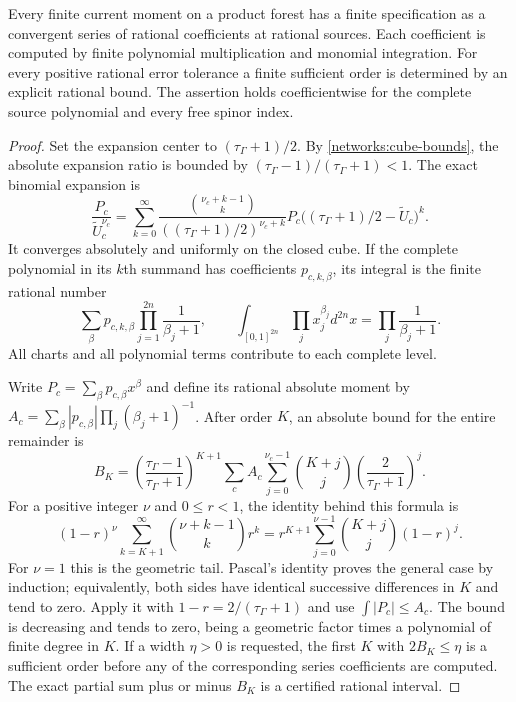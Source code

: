 \begin{theorem}
\label{networks:rational-series}
Every finite current moment on a product forest has a finite specification
as a convergent series of rational coefficients at rational sources.
Each coefficient is computed by finite polynomial multiplication and
monomial integration.  For every positive rational error tolerance a
finite sufficient order is determined by an explicit rational bound.
The assertion holds coefficientwise for the complete source polynomial
and every free spinor index.
\end{theorem}
\begin{proof}
Set the expansion center to $(\tau_\Gamma+1)/2$.  By
\eqref{networks:cube-bounds}, the absolute expansion ratio is bounded by
$(\tau_\Gamma-1)/(\tau_\Gamma+1)<1$.  The exact binomial expansion is
\begin{equation}
 \frac{P_c}{\widetilde U_c^{\nu_c}}
 =\sum_{k=0}^{\infty}
 \frac{\binom{\nu_c+k-1}{k}}
      {((\tau_\Gamma+1)/2)^{\nu_c+k}}
 P_c\bigl((\tau_\Gamma+1)/2-\widetilde U_c\bigr)^k.
 \label{networks:binomial-series}
\end{equation}
It converges absolutely and uniformly on the closed cube.  If the
complete polynomial in its $k$th summand has coefficients $p_{c,k,\beta}$,
its integral is the finite rational number
\begin{equation}
 \sum_{\beta}p_{c,k,\beta}
           \prod_{j=1}^{2n}\frac1{\beta_j+1},\qquad
 \int_{[0,1]^{2n}}\prod_jx_j^{\beta_j}d^{2n}x
                   =\prod_j\frac1{\beta_j+1}.
 \label{networks:cube-moments}
\end{equation}
All charts and all polynomial terms contribute to each complete level.

Write $P_c=\sum_\beta p_{c,\beta}x^\beta$ and define its rational absolute
moment by
$A_c=\sum_\beta|p_{c,\beta}|\prod_j(\beta_j+1)^{-1}$.
After order $K$, an absolute bound for the entire remainder is
\begin{equation}
 \boxed{
 B_K=\left(\frac{\tau_\Gamma-1}{\tau_\Gamma+1}\right)^{K+1}
 \sum_c A_c\sum_{j=0}^{\nu_c-1}
       \binom{K+j}{j}\left(\frac2{\tau_\Gamma+1}\right)^j.}
 \label{networks:tail}
\end{equation}
For a positive integer $\nu$ and $0\le r<1$, the identity behind this
formula is
\begin{equation}
 (1-r)^\nu\sum_{k=K+1}^{\infty}\binom{\nu+k-1}{k}r^k
 =r^{K+1}\sum_{j=0}^{\nu-1}\binom{K+j}{j}(1-r)^j.
 \label{networks:finite-tail-identity}
\end{equation}
For $\nu=1$ this is the geometric tail.  Pascal's identity proves the
general case by induction; equivalently, both sides have identical
successive differences in $K$ and tend to zero.  Apply it with
$1-r=2/(\tau_\Gamma+1)$ and use
$\int|P_c|\le A_c$.
The bound is decreasing and tends to zero, being a geometric factor
times a polynomial of finite degree in $K$.  If a width $\eta>0$ is
requested, the first $K$ with $2B_K\le\eta$ is a sufficient order before
any of the corresponding series coefficients are computed.  The exact
partial sum plus or minus $B_K$ is a certified rational interval.
\end{proof}

